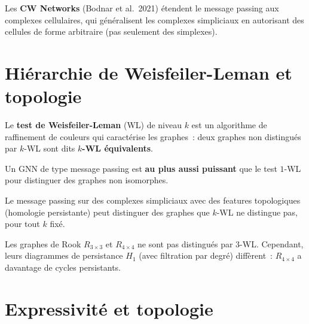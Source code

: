 \begin{definition}
Les \textbf{CW Networks} (Bodnar et al.\ 2021) \'etendent le
message passing aux complexes cellulaires, qui g\'en\'eralisent
les complexes simpliciaux en autorisant des cellules de forme
arbitraire (pas seulement des simplexes).
\end{definition}

\section{Hi\'erarchie de Weisfeiler-Leman et topologie}
\label{sec:wl_topo}

\begin{definition}
Le \textbf{test de Weisfeiler-Leman} (WL) de niveau $k$ est un
algorithme de raffinement de couleurs qui caract\'erise les graphes~:
deux graphes non distingu\'es par $k$-WL sont dits
\textbf{$k$-WL \'equivalents}.
\end{definition}

\begin{theoreme}
Un GNN de type message passing est \textbf{au plus aussi puissant}
que le test $1$-WL pour distinguer des graphes non isomorphes.
\end{theoreme}

\begin{theoreme}
Le message passing sur des complexes simpliciaux avec des features
topologiques (homologie persistante) peut distinguer des graphes
que $k$-WL ne distingue pas, pour tout $k$ fix\'e.
\end{theoreme}

\begin{exemple}
Les graphes de Rook $R_{3 \times 3}$ et $R_{4 \times 4}$ ne sont
pas distingu\'es par $3$-WL. Cependant, leurs diagrammes de
persistance $H_1$ (avec filtration par degr\'e) diff\`erent~:
$R_{4 \times 4}$ a davantage de cycles persistants.
\end{exemple}

\section{Expressivit\'e et topologie}
\label{sec:expressivite}


